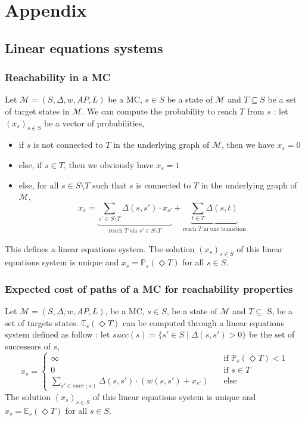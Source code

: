 \chapter*{Appendix}

\section{Linear equations systems}
\subsection{Reachability in a MC}
Let $\mathcal{M} = (S, \Delta, w, AP, L)$ be a MC, $s \in S$ be a state of $\mathcal{M}$ and $T \subseteq S$ be a set of target states in $\mathcal{M}$.
We can compute the probability to reach $T$ from $s$ :
let $(x_s)_{s \in S}$ be a vector of probabilities,
\begin{itemize}
	\item if $s$ is not connected to $T$ in the underlying graph of $\mathcal{M}$, then we have $x_s = 0$
	\item else, if $s \in T$, then we obviously have $x_s = 1$
	\item else, for all $s \in S \setminus T$  such that $s$ is connected to $T$ in the underlying graph of $\mathcal{M}$,
		\[
      x_s = \underbrace{\sum_{s' \in S \setminus T} \Delta(s, s') \cdot x_{s'}}_{\text{reach $T$ via $s' \in S \setminus T$}} + \underbrace{\sum_{t \in T} \Delta(s, t)}_{\text{reach $T$ in one transition}}
    \]
\end{itemize}
This defines a linear equations system. The solution $(x_s)_{s \in S}$ of this linear equations system is unique and $x_s = \mathbb{P}_s(\Diamond T)$ for all $s \in S$.

\subsection{Expected cost of paths of a MC for reachability properties}
  Let $\mathcal{M} = (S, \Delta, w, AP, L)$, be a MC, $s \in S$, be a state of $\mathcal{M}$ and $T \subseteq$ S, be a set of targets states. $\mathbb{E}_s(\Diamond T)$ can be computed through a linear equations system defined as follow : 
  let $succ(s) = \{ s' \in S \; | \; \Delta(s, s') > 0 \}$ be the set of successors of $s$,
  \[ x_s =
  	\begin{cases}
  	\infty & \quad \text{if } \mathbb{P}_s(\Diamond T) < 1 \\
  	0 & \quad \text{if } s \in T \\
  	\sum_{s' \in succ(s)} \Delta(s, s') \cdot (w(s, s') + x_{s'}) & \quad \text{else}
  	\end{cases}
  \]
The solution $(x_s)_{s \in S}$ of this linear equations system is unique and $x_s = \mathbb{E}_s(\Diamond T)$ for all $s \in S$.
